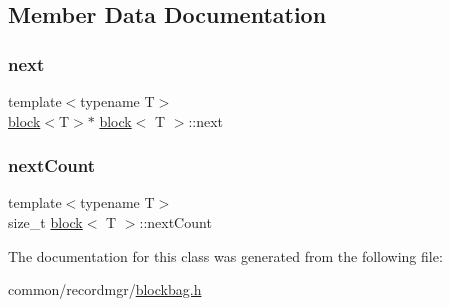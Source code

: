 \subsection{Member Data Documentation}
\mbox{\label{classblock_a3c34670f424559a9404c00a0dafe48ce}} 
\subsubsection{\texorpdfstring{next}{next}}
{\footnotesize\ttfamily template$<$typename T$>$ \\
\hyperlink{classblock}{block}$<$T$>$$\ast$ \hyperlink{classblock}{block}$<$ T $>$\+::next}

\mbox{\label{classblock_aa69ddeb6abdf14f17bb47598d10e6380}} 
\subsubsection{\texorpdfstring{next\+Count}{nextCount}}
{\footnotesize\ttfamily template$<$typename T$>$ \\
size\+\_\+t \hyperlink{classblock}{block}$<$ T $>$\+::next\+Count}



The documentation for this class was generated from the following file\+:\begin{DoxyCompactItemize}
\item 
common/recordmgr/\hyperlink{blockbag_8h}{blockbag.\+h}\end{DoxyCompactItemize}
